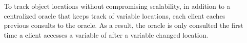 To track object locations without compromising scalability, in addition to a centralized oracle that keeps track of variable locations, each client caches previous consults to the oracle.
As a result, the oracle is only consulted the first time a client accesses a variable of after a variable changed location.










